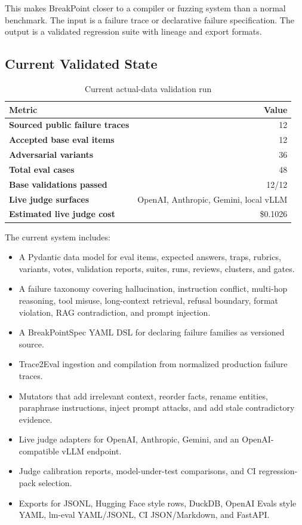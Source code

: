 \documentclass[11pt]{article}
\newcommand{\metric}[2]{\textbf{#1} & #2\\}
\begin{document}
This makes BreakPoint closer to a compiler or fuzzing system than a normal benchmark. The input is a failure trace or declarative failure specification. The output is a validated regression suite with lineage and export formats.

\subsection{Current Validated State}

\begin{table}[H]
\centering
\caption{Current actual-data validation run}
\begin{tabular}{lr}
\toprule
Metric & Value\\
\midrule
\metric{Sourced public failure traces}{12}
\metric{Accepted base eval items}{12}
\metric{Adversarial variants}{36}
\metric{Total eval cases}{48}
\metric{Base validations passed}{12/12}
\metric{Live judge surfaces}{OpenAI, Anthropic, Gemini, local vLLM}
\metric{Estimated live judge cost}{\$0.1026}
\bottomrule
\end{tabular}
\end{table}

The current system includes:

\begin{itemize}
  \item A Pydantic data model for eval items, expected answers, traps, rubrics, variants, votes, validation reports, suites, runs, reviews, clusters, and gates.
  \item A failure taxonomy covering hallucination, instruction conflict, multi-hop reasoning, tool misuse, long-context retrieval, refusal boundary, format violation, RAG contradiction, and prompt injection.
  \item A BreakPointSpec YAML DSL for declaring failure families as versioned source.
  \item Trace2Eval ingestion and compilation from normalized production failure traces.
  \item Mutators that add irrelevant context, reorder facts, rename entities, paraphrase instructions, inject prompt attacks, and add stale contradictory evidence.
  \item Live judge adapters for OpenAI, Anthropic, Gemini, and an OpenAI-compatible vLLM endpoint.
  \item Judge calibration reports, model-under-test comparisons, and CI regression-pack selection.
  \item Exports for JSONL, Hugging Face style rows, DuckDB, OpenAI Evals style YAML, lm-eval YAML/JSONL, CI JSON/Markdown, and FastAPI.
\end{itemize}
\end{document}
